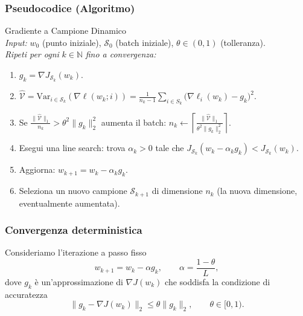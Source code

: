 \documentclass[a4paper,12pt]{article}
\numberwithin{equation}{section}
\numberwithin{figure}{section}
\numberwithin{table}{section}
\newcommand{\Var}{\mathrm{Var}}
\begin{document}
\subsubsection{Pseudocodice (Algoritmo)}

\begin{actionbox}
  Gradiente a Campione Dinamico\\[0.1cm]
  \textit{Input:} $w_0$ (punto iniziale), $\mathcal{S}_0$ (batch iniziale), $\theta \in (0,1)$ (tolleranza).\\[0.05cm]
  \textit{Ripeti per ogni } $k \in \mathbb{N}$ \textit{ fino a convergenza:}
  \begin{enumerate}\setlength{\itemsep}{1pt}\setlength{\topsep}{3pt}\setlength{\parskip}{0pt}
    \item $g_k = \nabla J_{\mathcal{S}_k}(w_k)$.
    \item $\widehat{\mathcal{V}} = \Var_{i \in \mathcal{S}_k}(\nabla \ell(w_k;i)) = \frac{1}{n_k - 1} \sum_{i \in S_k} \bigl(\nabla \ell_i(w_k) - g_k\bigr)^2
$.
    \item Se $\frac{\|\widehat{\mathcal{V}}\|_1}{n_k} > \theta^2 \|g_k\|_2^2$ aumenta il batch: $n_k \leftarrow \left\lceil \frac{\|\widehat{\mathcal{V}}\|_1}{\theta^2 \|g_k\|_2^2} \right\rceil$.
    \item Esegui una line search: trova $\alpha_k > 0$ tale che $J_{\mathcal{S}_k}(w_k - \alpha_k g_k) < J_{\mathcal{S}_k}(w_k)$.
    \item Aggiorna: $w_{k+1} = w_k - \alpha_k g_k$.
    \item Seleziona un nuovo campione $\mathcal{S}_{k+1}$ di dimensione $n_k$ (la nuova dimensione, eventualmente aumentata).
  \end{enumerate}
\end{actionbox}


\newpage
\subsubsection{Convergenza deterministica}\label{sec:convergenza-deterministica}

Consideriamo l'iterazione a passo fisso
\[
w_{k+1} = w_k - \alpha g_k, \qquad \alpha = \frac{1-\theta}{L},
\]
dove $g_k$ è un'approssimazione di $\nabla J(w_k)$ che soddisfa la condizione di accuratezza
\[
\|g_k - \nabla J(w_k)\|_2 \leq \theta \|g_k\|_2, \qquad \theta \in [0,1).
\]
\end{document}
